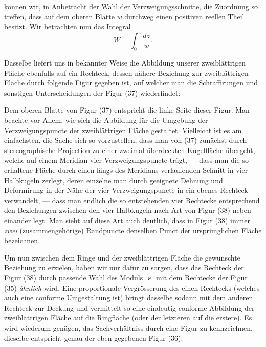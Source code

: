 \documentclass{article}
\begin{document}
können wir, in Anbetracht der Wahl der Verzweigungsschnitte, die Zuordnung so treffen, dass auf dem oberen Blatte $w$ durchweg einen positiven reellen Theil besitzt. Wir betrachten nun das Integral
\[ W = \int_{0}^{z} \frac{dz}{w}. \]

Dasselbe liefert uns in bekannter Weise die Abbildung unserer zweiblättrigen Fläche ebenfalls auf ein Rechteck, dessen nähere Beziehung zur zweiblättrigen Fläche durch folgende Figur gegeben ist, auf welcher man die Schraffirungen und sonstigen Unterscheidungen der Figur (37) wiederfindet:


Dem oberen Blatte von Figur (37) entspricht die linke Seite dieser Figur. Man beachte vor Allem, wie sich die Abbildung für die Umgebung der Verzweigungspuncte der zweiblättrigen Fläche gestaltet. Vielleicht ist es am einfachsten, die Sache sich so vorzustellen, dass man von (37) zunächst durch stereographische Projection zu einer zweimal überdeckten Kugelfläche übergeht, welche auf einem Meridian vier Verzweigungspuncte trägt, --- dass man die so erhaltene Fläche durch einen längs des Meridians verlaufenden Schnitt in vier Halbkugeln zerlegt, deren einzelne man durch geeignete Dehnung und Deformirung in der Nähe der vier Verzweigungspuncte in ein ebenes Rechteck verwandelt, --- dass man endlich die so entstehenden vier Rechtecke entsprechend den Beziehungen zwischen den vier Halbkugeln nach Art von Figur (38) neben einander legt. Man sieht auf diese Art auch deutlich, dass in Figur (38) immer \emph{zwei} (zusammengehörige) Randpuncte denselben Punct der ursprünglichen Fläche bezeichnen.


Um nun zwischen dem Ringe und der zweiblättrigen Fläche die gewünschte Beziehung zu erzielen, haben wir nur dafür zu sorgen, dass das Rechteck der Figur (38) durch passende Wahl des Moduls $\varkappa$ mit dem Rechtecke der Figur (35) \emph{ähnlich} wird. Eine proportionale Vergrösserung des einen Rechtecks (welches auch eine conforme Umgestaltung ist) bringt dasselbe sodann mit dem anderen Rechteck zur Deckung und vermittelt so eine eindeutig-conforme Abbildung der zweiblättrigen Fläche auf die Ringfläche (oder der letzteren auf die erstere). Es wird wiederum genügen, das Sachverhältniss durch eine Figur zu kennzeichnen, dieselbe entspricht genau der eben gegebenen Figur (36):
\end{document}
